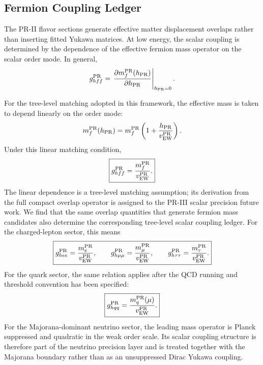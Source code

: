 \documentclass[11pt]{article}
\begin{document}
\subsection{Fermion Coupling Ledger}
\label{sec:pr2_order_mode_fermion_couplings}

The PR-II flavor sections generate effective matter displacement overlaps rather than inserting fitted Yukawa \cite{Yukawa1935} matrices. 
At low energy, the scalar coupling is determined by the dependence of the
effective fermion mass operator on the scalar order mode. In general,
\begin{equation}
g_{hff}^{\rm PR}
=
\left.
\frac{\partial m_f^{\rm PR}(h_{\rm PR})}
{\partial h_{\rm PR}}
\right|_{h_{\rm PR}=0}.
\end{equation}

For the tree-level matching adopted in this framework, the effective mass is taken to depend linearly on the order mode:
\begin{equation}
m_f^{\rm PR}(h_{\rm PR})
=
m_f^{\rm PR}
\left(
1+\frac{h_{\rm PR}}{v_{\rm EW}^{\rm PR}}
\right).
\end{equation}
Under this linear matching condition,
\begin{equation}
\boxed{
g_{hff}^{\rm PR}
=
\frac{m_f^{\rm PR}}{v_{\rm EW}^{\rm PR}}.
}
\end{equation}
The linear dependence is a tree-level matching assumption; its derivation from the full compact overlap operator is assigned to the PR-III scalar precision future work. We find that the same overlap quantities that generate fermion mass candidates also determine the corresponding tree-level scalar coupling ledger. For the charged-lepton sector, this means
\begin{equation}
\boxed{
g_{hee}^{\rm PR}
=
\frac{m_e^{\rm PR}}{v_{\rm EW}^{\rm PR}},
\qquad
g_{h\mu\mu}^{\rm PR}
=
\frac{m_\mu^{\rm PR}}{v_{\rm EW}^{\rm PR}},
\qquad
g_{h\tau\tau}^{\rm PR}
=
\frac{m_\tau^{\rm PR}}{v_{\rm EW}^{\rm PR}}.
}
\end{equation}
For the quark sector, the same relation applies after the QCD running and threshold convention has been specified:
\begin{equation}
\boxed{
g_{hqq}^{\rm PR}
=
\frac{
m_q^{\rm PR}(\mu)
}{
v_{\rm EW}^{\rm PR}
}.
}
\end{equation}
For the Majorana-dominant neutrino sector, the leading mass operator is Planck suppressed and quadratic in the weak order scale. 
Its scalar coupling structure is therefore part of the neutrino precision layer and is treated together with the Majorana boundary rather than as an unsuppressed Dirac Yukawa coupling.
\end{document}
